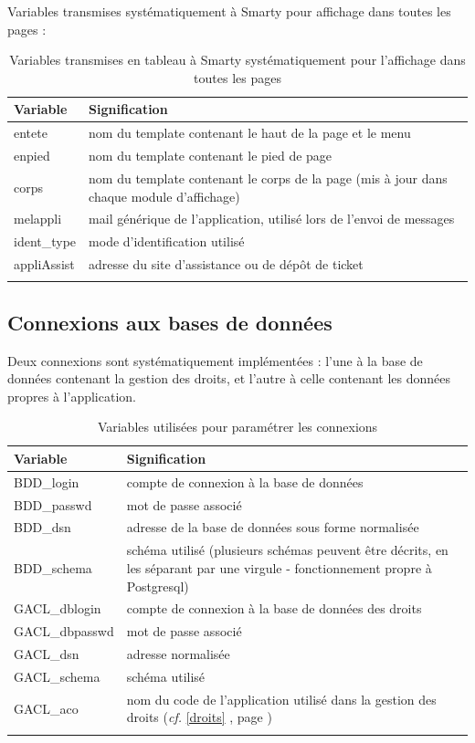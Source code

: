 Variables transmises systématiquement à Smarty pour affichage dans toutes les pages :

\begin{longtable}{|p{5cm}|p{8cm}|}
\hline
\textbf{Variable} & \textbf{Signification} \\
\hline
\endhead
entete & nom du template contenant le haut de la page et le menu \\
enpied & nom du template contenant le pied de page \\
corps & nom du template contenant le corps de la page (mis à jour dans chaque module d'affichage)\\
melappli & mail générique de l'application, utilisé lors de l'envoi de messages \\
ident\_type & mode d'identification utilisé \\
appliAssist & adresse du site d'assistance ou de dépôt de ticket \\
\hline
\caption{Variables transmises en tableau à Smarty systématiquement pour l'affichage dans toutes les pages}
\end{longtable}


\subsection{Connexions aux bases de données}

Deux connexions sont systématiquement implémentées : l'une à la base de données contenant la gestion des droits, et l'autre à celle contenant les données propres à l'application.
\begin{longtable}{|p{5cm}|p{8cm}|}
\hline
\textbf{Variable} & \textbf{Signification} \\
\hline
\endhead
\hline\endfoot\endlastfoot
BDD\_login & compte de connexion à la base de données \\
BDD\_passwd & mot de passe associé\\
BDD\_dsn & adresse de la base de données sous forme normalisée\\
BDD\_schema & schéma utilisé (plusieurs schémas peuvent être décrits, en les séparant par une virgule - fonctionnement propre à Postgresql)\\
GACL\_dblogin & compte de connexion à la base de données des droits\\
GACL\_dbpasswd & mot de passe associé\\
GACL\_dsn & adresse normalisée \\
GACL\_schema & schéma utilisé\\
GACL\_aco & nom du code de l'application utilisé dans la gestion des droits (\textit{cf.} \ref{droits} \textit{\nameref{droits}}, page \pageref{droits} )\\

\hline
\caption{Variables utilisées pour paramétrer les connexions}
\end{longtable}


